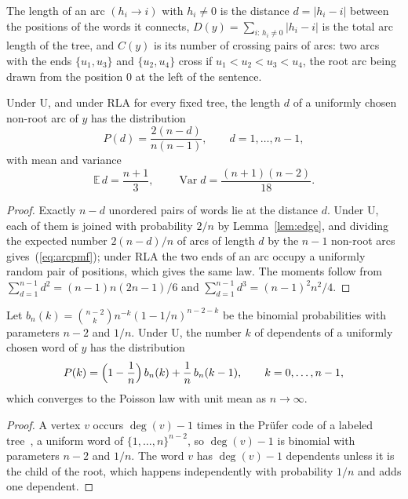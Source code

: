 \documentclass[mathematics,article,submit,pdftex,oneauthor]{Definitions/mdpi}
\newcommand{\E}{\mathbb E}
\newcommand{\Var}{\operatorname{Var}}
\begin{document}
The length of an arc $(h_i\to i)$ with $h_i\neq0$ is the distance $d=|h_i-i|$ between the positions of the words it connects, $D(y)=\sum_{i:\,h_i\neq0}|h_i-i|$ is the total arc length of the tree, and $C(y)$ is its number of crossing pairs of arcs: two arcs with the ends $\{u_1,u_3\}$ and $\{u_2,u_4\}$ cross if $u_1<u_2<u_3<u_4$, the root arc being drawn from the position $0$ at the left of the sentence.

\begin{Lemma}\label{lem:arc}
Under U, and under RLA for every fixed tree, the length $d$ of a uniformly chosen non-root arc of $y$ has the distribution
\begin{equation}\label{eq:arcpmf}
P(d)=\frac{2(n-d)}{n(n-1)},\qquad d=1,\dots,n-1,
\end{equation}
with mean and variance
\begin{equation}\label{eq:random_length}
\E\,d=\frac{n+1}{3},\qquad \Var d=\frac{(n+1)(n-2)}{18}.
\end{equation}
\end{Lemma}
\begin{proof}
Exactly $n-d$ unordered pairs of words lie at the distance $d$.
Under U, each of them is joined with probability $2/n$ by Lemma~\ref{lem:edge}, and dividing the expected number $2(n-d)/n$ of arcs of length $d$ by the $n-1$ non-root arcs gives~(\ref{eq:arcpmf}); under RLA the two ends of an arc occupy a uniformly random pair of positions, which gives the same law.
The moments follow from $\sum_{d=1}^{n-1}d^2=(n-1)n(2n-1)/6$ and $\sum_{d=1}^{n-1}d^3=(n-1)^2n^2/4$.
\end{proof}

\begin{Lemma}\label{lem:outdeg}
Let $b_n(k)=\binom{n-2}{k}n^{-k}(1-1/n)^{n-2-k}$ be the binomial probabilities with parameters $n-2$ and $1/n$.
Under U, the number $k$ of dependents of a uniformly chosen word of $y$ has the distribution
\begin{equation}\label{eq:outdeg}
P(k)=\Bigl(1-\frac1n\Bigr)\,b_n(k)+\frac1n\,b_n(k-1),\qquad k=0,\dots,n-1,
\end{equation}
which converges to the Poisson law with unit mean as $n\to\infty$.
\end{Lemma}
\begin{proof}
A vertex $v$ occurs $\deg(v)-1$ times in the Pr\"ufer code of a labeled tree~\cite{Prufer1918}, a uniform word of $\{1,\dots,n\}^{n-2}$, so $\deg(v)-1$ is binomial with parameters $n-2$ and $1/n$.
The word $v$ has $\deg(v)-1$ dependents unless it is the child of the root, which happens independently with probability $1/n$ and adds one dependent.
\end{proof}
\end{document}
